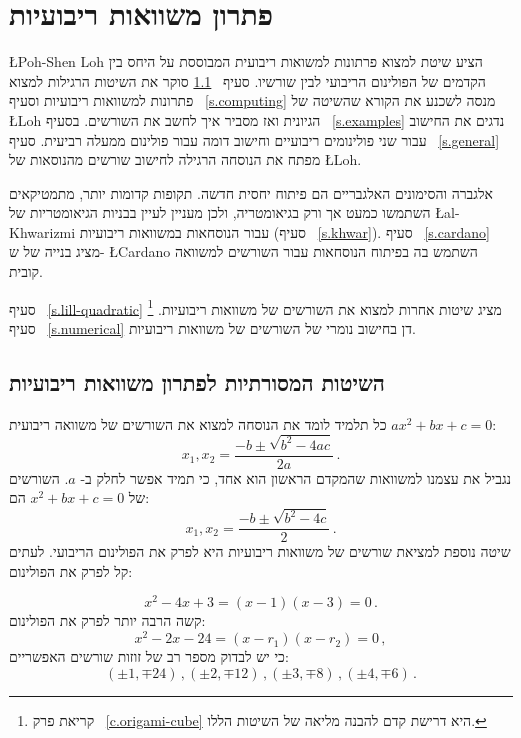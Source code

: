 

\chapter{פתרון משוואות ריבועיות}\label{c.quadratic}

\L{Poh-Shen Loh}
הציע שיטת למצוא פרתונות למשואות ריבועית המבוססת על היחס בין הקדמים של הפולינום הריבועי לבין שורשיו. סעיף%
~\ref{s.traditional}
סוקר את השיטות הרגילות למצוא פתרונות למשוואות ריבועיות וסעיף%
~\ref{s.computing}
מנסה לשכנע את הקורא שהשיטה של
\L{Loh}
הגיונית ואז מסביר איך לחשב את השורשים. בסעיף%
~\ref{s.examples}
נדגים את החישוב עבור שני פולינומים ריבועיים וחישוב דומה עבור פולינום ממעלה רביעית. סעיף%
~\ref{s.general}
מפתח את הנוסחה הרגילה לחישוב שורשים מהנוסאות של 
\L{Loh}.

אלגברה והסימונים האלגבריים הם פיתוח יחסית חדשה. תקופות קדומות יותר, מתמטיקאים השתמשו כמעט אך ורק בגיאומטריה, ולכן מעניין לעיין בבניות הגיאומטריות של
\L{al-Khwarizmi}
עבור הנוסחאות במשוואות ריבועיות (סעיף%
~\ref{s.khwar}).
סעיף%
~\ref{s.cardano}
מציג בנייה של ש-%
\L{Cardano}
השתמש בה בפיתוח הנוסחאות עבור השורשים למשוואה קובית.

סעיף%
~\ref{s.lill-quadratic}
מציג שיטות אחרות למצוא את השורשים של משוואות ריבועיות.%
\footnote{קריאת פרק%
~\ref{c.origami-cube}
היא דרישת קדם להבנה מליאה של השיטות הללו.}
סעיף%
~\ref{s.numerical}
דן בחישוב נומרי של השורשים של משוואות ריבועיות.

\section{השיטות המסורתיות לפתרון משוואות ריבועיות}\label{s.traditional}

כל תלמיד לומד את הנוסחה למצוא את השורשים של משוואה ריבועית
$ax^2+bx+c=0$:
\[
x_1, x_2 = \frac{-b\pm\sqrt{b^2-4ac}}{2a}\,.
\]
נגביל את עצמנו למשוואות שהמקדם הראשון הוא אחד, כי תמיד אפשר לחלק ב-%
$a$.
השורשים של
$x^2+bx+c=0$
הם:
\begin{equation}\label{eq.quadratic-roots}
x_1, x_2 = \frac{-b\pm\sqrt{b^2-4c}}{2}\,.
\end{equation}
שיטה נוספת למציאת שורשים של משוואות ריבועיות היא לפרק את הפולינום הריבועי. לעתים קל לפרק את הפולינום:

\begin{equation}\label{eq.quadratic-lill}
x^2-4x+3= (x-1)(x-3)=0\,.
\end{equation}
קשה הרבה יותר לפרק את הפולינום:
\[
x^2-2x-24= (x-r_1)(x-r_2)=0\,,
\]
כי יש לבדוק מספר רב של זוזות שורשים האפשריים:
\[
(\pm 1,\mp 24)\,, (\pm 2,\mp 12)\,, (\pm 3,\mp 8)\,, (\pm 4,\mp 6)\,.
\]

